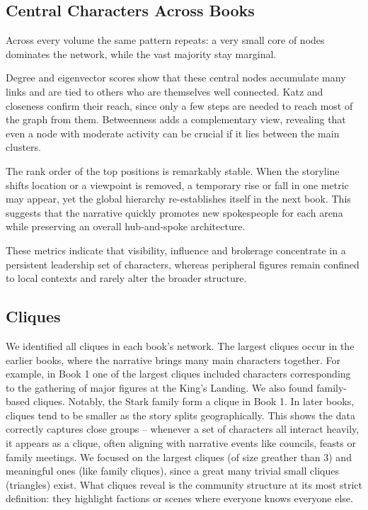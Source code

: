 \documentclass[12pt, a4paper]{article}
\begin{document}
\subsection*{Central Characters Across Books}
Across every volume the same pattern repeats: 
a very small core of nodes dominates the network, 
while the vast majority stay marginal.

Degree and eigenvector scores show that these central 
nodes accumulate many links and are tied to others 
who are themselves well connected. Katz and closeness 
confirm their reach, since only a few steps are needed 
to reach most of the graph from them. Betweenness adds 
a complementary view, revealing that even a node with 
moderate activity can be crucial if it lies between the main clusters. 

The rank order of the top positions is remarkably stable. 
When the storyline shifts location or a viewpoint is removed, 
a temporary rise or fall in one metric may appear, yet the global
 hierarchy re-establishes itself in the next book. 
 This suggests that the narrative quickly promotes new spokespeople 
 for each arena while preserving an overall hub-and-spoke architecture.

These metrics indicate that visibility, 
 influence and brokerage concentrate in a persistent 
 leadership set of characters, whereas peripheral figures remain 
 confined to local contexts and rarely alter the broader structure.


\subsection*{Cliques}
We identified all cliques in each book's network. The largest cliques occur in the earlier books, where the narrative brings many main characters together. For example, in Book 1 one of the largest cliques included characters corresponding to the gathering of major figures at the King's Landing. We also found family-based cliques. Notably, the Stark family form a clique in Book 1. In later books, cliques tend to be smaller as the story splits geographically. This shows the data correctly captures close groups – whenever a set of characters all interact heavily, it appears as a clique, often aligning with narrative events like councils, feasts or family meetings. 
We focused on the largest cliques (of size greather than 3) and meaningful ones (like family cliques), since a great many trivial small cliques (triangles) exist. What cliques reveal is the community structure at its most strict definition: they highlight factions or scenes where everyone knows everyone else. 
\end{document}
